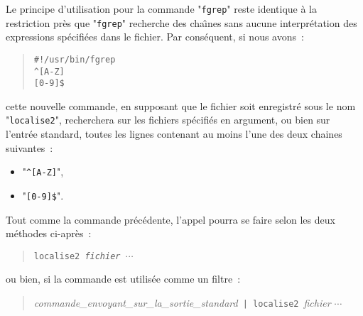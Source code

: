 Le principe d'utilisation pour la commande "{\tt fgrep}" reste identique {\`a} la
restriction pr{\`e}s que "{\tt fgrep}" recherche des cha{\^\i}nes sans aucune
interpr{\'e}tation des expressions sp{\'e}cifi{\'e}es dans le fichier. Par cons{\'e}quent, si nous
avons~:
\begin{quote}
\begin{verbatim}
#!/usr/bin/fgrep
^[A-Z]
[0-9]$
\end{verbatim}
\end{quote}
cette nouvelle commande, en supposant que le fichier soit enregistr{\'e} sous le nom
"{\tt localise2}", recherchera sur les fichiers sp{\'e}cifi{\'e}s en argument, ou
bien sur l'entr{\'e}e standard, toutes les lignes contenant au moins l'une des deux
chaines suivantes~:
\begin{itemize}
	\item	"\verb=^[A-Z]=",
	\item	"\verb=[0-9]$=".
\end{itemize}

Tout comme la commande pr{\'e}c{\'e}dente, l'appel pourra se faire selon les deux
m{\'e}thodes ci-apr{\`e}s~:
\begin{quote}
{\tt localise2~{\sl fichier $\cdots$}}
\end{quote}
ou bien, si la commande est utilis{\'e}e comme un filtre~:
\begin{quote}
{\sl commande\_envoyant\_sur\_la\_sortie\_standard}~\verb=| localise2=~{\sl fichier $\cdots$}
\end{quote}
